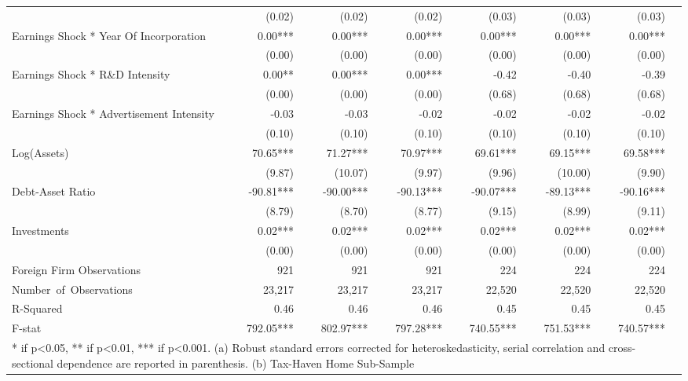 \begin{table}[ht]
{\begin{tabular}{p{8cm}rrrrrrr}
 & (0.02) & (0.02) & (0.02)  & (0.03) & (0.03) & (0.03) \\
Earnings Shock * Year Of Incorporation  & 0.00*** & 0.00*** & 0.00***  & 0.00*** & 0.00*** & 0.00*** \\
 & (0.00) & (0.00) & (0.00) & (0.00) & (0.00) & (0.00) \\
Earnings Shock * R\&D Intensity  & 0.00**  & 0.00*** & 0.00*** & -0.42    & -0.40    & -0.39    \\
 & (0.00) & (0.00) & (0.00)  & (0.68) & (0.68) & (0.68) \\
Earnings Shock * Advertisement Intensity     & -0.03    & -0.03    & -0.02    & -0.02    & -0.02    & -0.02    \\
  & (0.10) & (0.10) & (0.10) & (0.10) & (0.10) & (0.10) \\
Log(Assets)  & 70.65*** & 71.27*** & 70.97*** & 69.61*** & 69.15*** & 69.58*** \\
 & (9.87) & (10.07) & (9.97) & (9.96) & (10.00) & (9.90) \\
Debt-Asset Ratio  & -90.81*** & -90.00*** & -90.13*** & -90.07*** & -89.13*** & -90.16*** \\
 & (8.79) & (8.70) & (8.77) & (9.15) & (8.99) & (9.11) \\
Investments  & 0.02*** & 0.02*** & 0.02*** & 0.02*** & 0.02*** & 0.02*** \\
 & (0.00) & (0.00) & (0.00) & (0.00) & (0.00) & (0.00) \\
\midrule
Foreign Firm Observations  & 921 & 921 & 921  & 224 & 224 & 224 \\
 Number~of~Observations   & 23,217 & 23,217 & 23,217 & 22,520 & 22,520 & 22,520 \\
R-Squared  & 0.46 & 0.46 & 0.46  & 0.45 & 0.45 & 0.45 \\
F-stat  & 792.05*** & 802.97*** & 797.28*** & 740.55*** & 751.53*** & 740.57*** \\
\bottomrule
\multicolumn{7}{p{20cm}}{* if p<0.05, ** if p<0.01, *** if p<0.001. (a) Robust standard errors corrected for heteroskedasticity, serial correlation and cross-sectional dependence are reported in parenthesis. (b) Tax-Haven Home Sub-Sample}   
 \end{tabular}
 }  
 \end{table}




